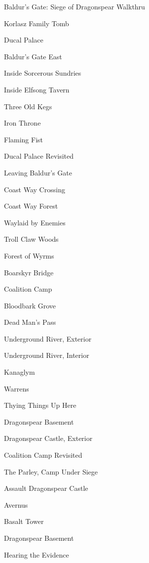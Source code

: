 \documentclass[10pt,a4,twoside]{book}
\begin{document}
\begin{titlepage}
\begin{center}
{\Huge Baldur's Gate: Siege of Dragonspear Walkthru}
\end{center}
\begin{multicols}{3} %

\begin{trivlist}
\item Korlasz Family Tomb
\item Ducal Palace
\item Baldur's Gate East
\item Inside Sorcerous Sundries
\item Inside Elfsong Tavern
\item Three Old Kegs
\item Iron Throne
\item Flaming Fist
\item Ducal Palace Revisited
\item Leaving Baldur's Gate
\item Coast Way Crossing
\item Coast Way Forest
\item Waylaid by Enemies
\item Troll Claw Woods
\item Forest of Wyrms
\item Boarskyr Bridge
\item Coalition Camp
\item Bloodbark Grove
\item Dead Man's Pass
\item Underground River, Exterior
\item Underground River, Interior
\item Kanaglym
\item Warrens
\item Thying Things Up Here
\item Dragonspear Basement
\item Dragonspear Castle, Exterior
\item Coalition Camp Revisited
\item The Parley, Camp Under Siege
\item Assault Dragonspear Castle
\item Avernus
\item Basalt Tower
\item Dragonspear Basement
\item Hearing the Evidence

\end{trivlist}
\end{multicols}
\end{titlepage}
\end{document}
